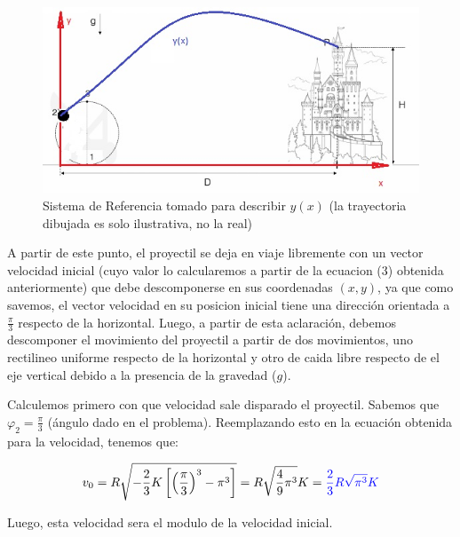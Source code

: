 \documentclass[fleqn,10pt]{SelfArx} %
\newcommand{\azul}[1]{\color{blue}{#1}}
\begin{document}
\begin{figure}[h] %
\centering
\includegraphics[scale=0.5]{figuras/fig5.jpg}
\caption{Sistema de Referencia tomado para describir $y(x)$ (la trayectoria dibujada es solo ilustrativa, no la real)}
\end{figure}

A partir de este punto, el proyectil se deja en viaje libremente con un vector velocidad inicial (cuyo valor lo calcularemos a partir de la ecuacion (3) obtenida anteriormente) que debe descomponerse en sus coordenadas $(x,y)$, ya que como savemos, el vector velocidad en su posicion inicial tiene una dirección orientada a $\frac{\pi}{3}$ respecto de la horizontal.
Luego, a partir de esta aclaración, debemos descomponer el movimiento del proyectil a partir de dos movimientos, uno rectilineo uniforme respecto de la horizontal y otro de caida libre respecto de el eje vertical debido a la presencia de la gravedad ($g$). 

Calculemos primero con que velocidad sale disparado el proyectil. Sabemos que ${\varphi}_2 = \frac{\pi}{3}$ (ángulo dado en el problema). Reemplazando esto en la ecuación obtenida para la velocidad, tenemos que:

\[v_0 = R \sqrt{ - \frac{2}{3} K \left[ \left(\frac{\pi}{3}\right)^3 - {\pi}^3  \right]} = R \sqrt{ \frac{4}{9} {\pi}^3} K 	= \azul{\frac{2}{3} R  \sqrt{ {\pi}^3} K}\] 

Luego, esta velocidad sera el modulo de la velocidad inicial.
\end{document}
